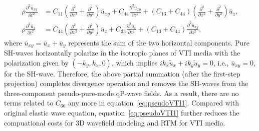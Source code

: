 \begin{equation}
\label{eq:pseudoVTI1}
\begin{split}
\rho\frac{\partial^2{\overline{u}_{xy}}}{\partial t^2} &=
                   C_{11}(\frac{\partial^2}{\partial x^2}+\frac{\partial^2}{\partial y^2}){\overline{u}_{xy}}
                  + C_{44}\frac{\partial^2{\overline{u}_{xy}}}{\partial z^2}
                  +(C_{13}+C_{44})(\frac{\partial^2}{\partial x^2}+\frac{\partial^2}{\partial y^2}){\overline{u}_z}, \\
\rho\frac{\partial^2{\overline{u}_z}}{\partial t^2} &= 
                   C_{44}(\frac{\partial^2}{\partial x^2}+\frac{\partial^2}{\partial y^2}){\overline{u}_z}
                  + C_{33}\frac{\partial^2{\overline{u}_z}}{\partial z^2} 
                  +(C_{13}+C_{44})\frac{\partial^2{\overline{u}_{xy}}}{\partial z^2},
\end{split}
\end{equation}
where $\overline{u}_{xy}=\overline{u}_{x}+\overline{u}_{y}$ represents the sum of the two horizontal components.
Pure SH-waves horizontally polarize in the isotropic planes of VTI media
with the polarization given by $(-k_{y}, k_{x}, 0)$, which implies $ik_{x}\widetilde{u}_{x}+ik_{y}\widetilde{u}_{y}=0$,
i.e., $\overline{u}_{xy}=0$, for the SH-wave.
Therefore, the above partial summation (after the first-step projection) completes divergence operation and removes the SH-waves from
the three-component pseudo-pure-mode qP-wave fields.
As a result, there are no terms related to $C_{66}$ any more in equation~\ref{eq:pseudoVTI1}.
Compared with original elastic wave equation, equation~\ref{eq:pseudoVTI1} further reduces the compuational
costs for 3D wavefield modeling and RTM for VTI media.

